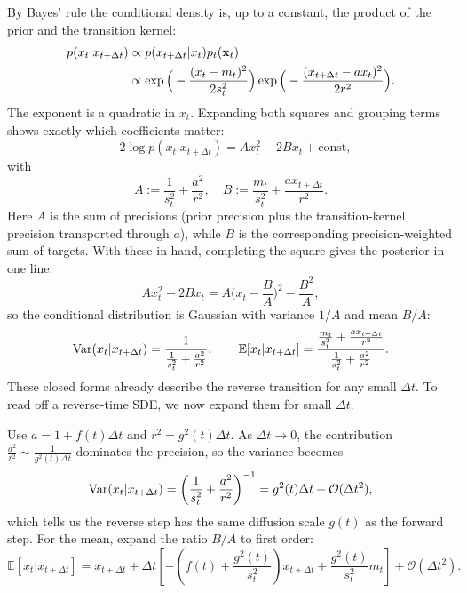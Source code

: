 By Bayes’ rule the conditional density is, up to a constant, the product of the prior and the transition kernel:
\begin{align*}
    p(x_t   |   x_{t+\Delta t})  &\propto p(x_{t+\Delta t} | x_t   ) p_t({\mathbf{x}}_t) \\&\propto
\exp\Big(-\frac{(x_t-m_t)^2}{2s_t^2}\Big)  
\exp\Big(-\frac{(x_{t+\Delta t}-a  x_t)^2}{2r^2}\Big).
\end{align*}
The exponent is a quadratic in $x_t$. Expanding both squares and grouping terms shows exactly which coefficients matter:
\[
-2\log p(x_t   |   x_{t+\Delta t})
 = 
A  x_t^2  -  2 B  x_t  +  \text{const},
\]
with
\[
A:=\frac{1}{s_t^2}+\frac{a^2}{r^2},\quad
B:=\frac{m_t}{s_t^2}+\frac{a  x_{t+\Delta t}}{r^2}.
\]
Here $A$ is the sum of precisions (prior precision plus the transition-kernel precision transported through $a$), while $B$ is the corresponding precision-weighted sum of targets. With these in hand, completing the square gives the posterior in one line:
\[
A x_t^2 - 2 B x_t
  =  
A\Big(x_t-\frac{B}{A}\Big)^2  -  \frac{B^2}{A},
\]
so the conditional distribution is Gaussian with variance $1/A$ and mean $B/A$:
\[
\mathrm{Var}(x_t   |   x_{t+\Delta t})   =   \frac{1}{\frac{1}{s_t^2}+\frac{a^2}{r^2}},
\qquad
\mathbb E[x_t   |   x_{t+\Delta t}]   =  
\frac{\frac{m_t}{s_t^2}+\frac{a  x_{t+\Delta t}}{r^2}}{\frac{1}{s_t^2}+\frac{a^2}{r^2}}.
\]
These closed forms already describe the reverse transition for any small $\Delta t$. To read off a reverse-time SDE, we now expand them for small $\Delta t$.

Use $a=1+f(t)\Delta t$ and $r^2=g^2(t)\Delta t$. As $\Delta t\to 0$, the contribution $\frac{a^2}{r^2}\sim \frac{1}{g^2(t)\Delta t}$ dominates the precision, so the variance becomes
\[
\mathrm{Var}(x_t   |   x_{t+\Delta t})
= \left(\frac{1}{s_t^2}+\frac{a^2}{r^2}\right)^{-1}
= g^2(t)  \Delta t  +  \mathcal{O}(\Delta t^2),
\]
which tells us the reverse step has the same diffusion scale $g(t)$ as the forward step. For the mean, expand the ratio $B/A$ to first order:
\[
\mathbb E[x_t   |   x_{t+\Delta t}]
  =  x_{t+\Delta t}
 +  \Delta t\left[
-\left(f(t)+\frac{g^2(t)}{s_t^2}\right)  x_{t+\Delta t}
 +  \frac{g^2(t)}{s_t^2}  m_t
\right]  +  \mathcal{O}(\Delta t^2).
\]

